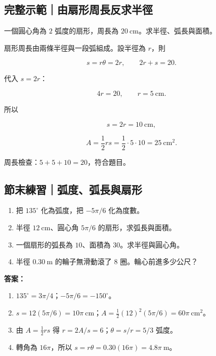 \documentclass[11pt,a4paper]{article}
\providecommand{\tightlist}{%
  \setlength{\itemsep}{0pt}\setlength{\parskip}{0pt}}
\begin{document}
\begin{HandoutWorkedExample}

\subsection{完整示範｜由扇形周長反求半徑}\label{ux5b8cux6574ux793aux7bc4ux7531ux6247ux5f62ux5468ux9577ux53cdux6c42ux534aux5f91}

一個圓心角為 \(2\) 弧度的扇形，周長為 \(20\ \mathrm{cm}\)。求半徑、弧長與面積。

扇形周長由兩條半徑與一段弧組成。設半徑為 \(r\)，則

\[
s=r\theta=2r,
\qquad
2r+s=20.
\]

代入 \(s=2r\)：

\[
4r=20,
\qquad
r=5\ \mathrm{cm}.
\]

所以

\[
s=2r=\boxed{10\ \mathrm{cm}},
\]

\[
A=\frac12rs
=\frac12\cdot5\cdot10
=\boxed{25\ \mathrm{cm^2}}.
\]

周長檢查：\(5+5+10=20\)，符合題目。

\end{HandoutWorkedExample}

\begin{HandoutSelfCheck}

\subsection{節末練習｜弧度、弧長與扇形}\label{ux7bc0ux672bux7df4ux7fd2ux5f27ux5ea6ux5f27ux9577ux8207ux6247ux5f62}

\begin{enumerate}
\def\labelenumi{\arabic{enumi}.}
\tightlist
\item
  把 \(135^\circ\) 化為弧度，把 \(-5\pi/6\) 化為度數。
\item
  半徑 \(12\ \mathrm{cm}\)、圓心角 \(5\pi/6\) 的扇形，求弧長與面積。
\item
  一個扇形的弧長為 \(10\)、面積為 \(30\)。求半徑與圓心角。
\item
  半徑 \(0.30\ \mathrm m\) 的輪子無滑動滾了 \(8\) 圈。輪心前進多少公尺？
\end{enumerate}

\textbf{答案：}

\begin{enumerate}
\def\labelenumi{\arabic{enumi}.}
\tightlist
\item
  \(135^\circ=3\pi/4\)；\(-5\pi/6=-150^\circ\)。
\item
  \(s=12(5\pi/6)=10\pi\ \mathrm{cm}\)；\(A=\tfrac12(12)^2(5\pi/6)=60\pi\ \mathrm{cm^2}\)。
\item
  由 \(A=\tfrac12rs\) 得 \(r=2A/s=6\)；\(\theta=s/r=5/3\) 弧度。
\item
  轉角為 \(16\pi\)，所以 \(s=r\theta=0.30(16\pi)=4.8\pi\ \mathrm m\)。
\end{enumerate}

\end{HandoutSelfCheck}
\end{document}
